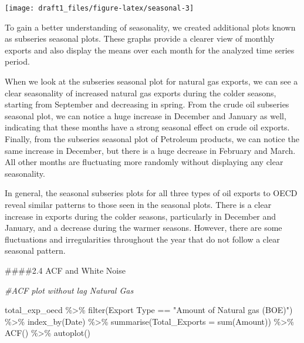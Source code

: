 \documentclass[
]{article}
\newenvironment{Shaded}{\begin{snugshade}}{\end{snugshade}}
\newcommand{\AttributeTok}[1]{\textcolor[rgb]{0.77,0.63,0.00}{#1}}
\newcommand{\CommentTok}[1]{\textcolor[rgb]{0.56,0.35,0.01}{\textit{#1}}}
\newcommand{\FunctionTok}[1]{\textcolor[rgb]{0.00,0.00,0.00}{#1}}
\newcommand{\NormalTok}[1]{#1}
\newcommand{\SpecialCharTok}[1]{\textcolor[rgb]{0.00,0.00,0.00}{#1}}
\newcommand{\StringTok}[1]{\textcolor[rgb]{0.31,0.60,0.02}{#1}}
\begin{document}
\begin{center}\texttt{[image: draft1\_files/figure-latex/seasonal-3]} \end{center}

To gain a better understanding of seasonality, we created additional
plots known as subseries seasonal plots. These graphs provide a clearer
view of monthly exports and also display the means over each month for
the analyzed time series period.

When we look at the subseries seasonal plot for natural gas exports, we
can see a clear seasonality of increased natural gas exports during the
colder seasons, starting from September and decreasing in spring. From
the crude oil subseries seasonal plot, we can notice a huge increase in
December and January as well, indicating that these months have a strong
seasonal effect on crude oil exports. Finally, from the subseries
seasonal plot of Petroleum products, we can notice the same increase in
December, but there is a huge decrease in February and March. All other
months are fluctuating more randomly without displaying any clear
seasonality.

In general, the seasonal subseries plots for all three types of oil
exports to OECD reveal similar patterns to those seen in the seasonal
plots. There is a clear increase in exports during the colder seasons,
particularly in December and January, and a decrease during the warmer
seasons. However, there are some fluctuations and irregularities
throughout the year that do not follow a clear seasonal pattern.

\#\#\#\#2.4 ACF and White Noise

\begin{Shaded}
\begin{Highlighting}[]
\CommentTok{\#ACF plot without lag Natural Gas}

\NormalTok{total\_exp\_oecd }\SpecialCharTok{\%\textgreater{}\%} \FunctionTok{filter}\NormalTok{(}\StringTok{\textasciigrave{}}\AttributeTok{Export Type}\StringTok{\textasciigrave{}} \SpecialCharTok{==} \StringTok{"Amount of Natural gas (BOE)"}\NormalTok{) }\SpecialCharTok{\%\textgreater{}\%} 
  \FunctionTok{index\_by}\NormalTok{(Date) }\SpecialCharTok{\%\textgreater{}\%} 
  \FunctionTok{summarise}\NormalTok{(}\AttributeTok{Total\_Exports =} \FunctionTok{sum}\NormalTok{(}\StringTok{\textasciigrave{}}\AttributeTok{Amount}\StringTok{\textasciigrave{}}\NormalTok{)) }\SpecialCharTok{\%\textgreater{}\%} 
  \FunctionTok{ACF}\NormalTok{() }\SpecialCharTok{\%\textgreater{}\%}  \FunctionTok{autoplot}\NormalTok{()}
\end{Highlighting}
\end{Shaded}
\end{document}
